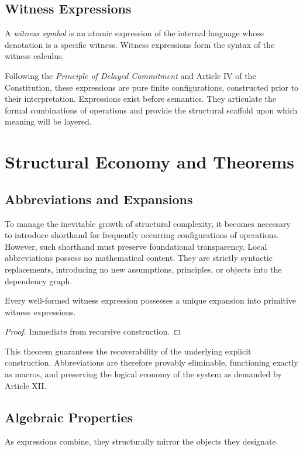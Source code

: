 \documentclass[12pt,anyside]{book}
\begin{document}
\subsection{Witness Expressions}
A \textit{witness symbol} is an atomic expression of the internal language whose denotation is a specific witness. Witness expressions form the syntax of the witness calculus. 

Following the \textit{Principle of Delayed Commitment} and Article IV of the Constitution, these expressions are pure finite configurations, constructed prior to their interpretation. Expressions exist before semantics. They articulate the formal combinations of operations and provide the structural scaffold upon which meaning will be layered.

\section{Structural Economy and Theorems}

\subsection{Abbreviations and Expansions}
To manage the inevitable growth of structural complexity, it becomes necessary to introduce shorthand for frequently occurring configurations of operations. However, such shorthand must preserve foundational transparency. Local abbreviations possess no mathematical content. They are strictly syntactic replacements, introducing no new assumptions, principles, or objects into the dependency graph.

\begin{theorem}
Every well-formed witness expression possesses a unique expansion into primitive witness expressions.
\end{theorem}
\begin{proof}
Immediate from recursive construction.
\end{proof}

This theorem guarantees the recoverability of the underlying explicit construction. Abbreviations are therefore provably eliminable, functioning exactly as macros, and preserving the logical economy of the system as demanded by Article XII.

\subsection{Algebraic Properties}
As expressions combine, they structurally mirror the objects they designate.
\end{document}
